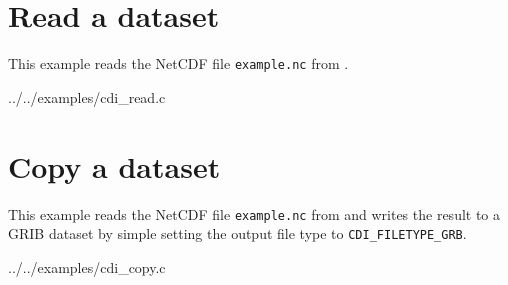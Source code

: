 \section{Read a dataset}

This example reads the NetCDF file {\tt example.nc} from .


{../../examples/cdi_read.c}


\section{Copy a dataset}

This example reads the NetCDF file {\tt example.nc} from 
and writes the result to a GRIB dataset by simple setting the output file type
to {\tt CDI\_FILETYPE\_GRB}.


{../../examples/cdi_copy.c}
